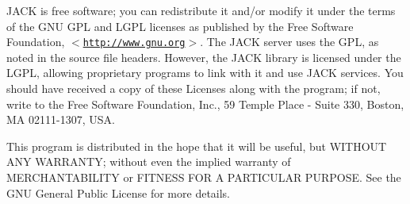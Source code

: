 JACK is free software; you can redistribute it and/or modify it under the terms of the GNU GPL and LGPL licenses as published by the Free Software Foundation, $<$\href{http://www.gnu.org}{\tt http://www.gnu.org}$>$. The JACK server uses the GPL, as noted in the source file headers. However, the JACK library is licensed under the LGPL, allowing proprietary programs to link with it and use JACK services. You should have received a copy of these Licenses along with the program; if not, write to the Free Software Foundation, Inc., 59 Temple Place - Suite 330, Boston, MA 02111-1307, USA.

This program is distributed in the hope that it will be useful, but WITHOUT ANY WARRANTY; without even the implied warranty of MERCHANTABILITY or FITNESS FOR A PARTICULAR PURPOSE. See the GNU General Public License for more details. 